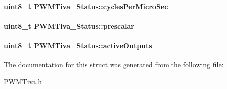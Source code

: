 \paragraph[{cycles\-Per\-Micro\-Sec}]{\setlength{\rightskip}{0pt plus 5cm}uint8\-\_\-t P\-W\-M\-Tiva\-\_\-\-Status\-::cycles\-Per\-Micro\-Sec}\label{struct_p_w_m_tiva___status_ab45856183a3fe6f2f350d49b9d60330e}
\paragraph[{prescalar}]{\setlength{\rightskip}{0pt plus 5cm}uint8\-\_\-t P\-W\-M\-Tiva\-\_\-\-Status\-::prescalar}\label{struct_p_w_m_tiva___status_a92fbd5e7351f2114f0403ca363eb51fb}
\paragraph[{active\-Outputs}]{\setlength{\rightskip}{0pt plus 5cm}uint8\-\_\-t P\-W\-M\-Tiva\-\_\-\-Status\-::active\-Outputs}\label{struct_p_w_m_tiva___status_a7f5f9f86d8c0ddc3d90296fadf6e1133}


The documentation for this struct was generated from the following file\-:\begin{DoxyCompactItemize}
\item 
\hyperlink{_p_w_m_tiva_8h}{P\-W\-M\-Tiva.\-h}\end{DoxyCompactItemize}
